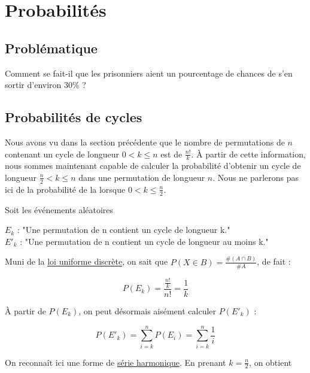 \section{Probabilités}
\subsection{Problématique}

	Comment se fait-il que les prisonniers aient un pourcentage de chances de s'en sortir d'environ 30\% ? \\

\subsection{Probabilités de cycles}

	Nous avons vu dans la section précédente que le nombre de permutations de $n$ contenant un cycle de longueur $0 < k \leq n$ est de $\frac{n!}{k}$.
	À partir de cette information, nous sommes maintenant capable de calculer la probabilité d'obtenir un cycle de longueur $\frac{n}{2} < k \leq n$ dans une permutation de longueur $n$.
	Nous ne parlerons pas ici de la probabilité de la lorsque $0 < k \leq \frac{n}{2}$.

	Soit les événements aléatoires
	\begin{center}
		$E_k$ : "Une permutation de n contient un cycle de longueur k." \\
		$E'_k$ : "Une permutation de n contient un cycle de longueur au moins k."
	\end{center}

	Muni de la \href{https://fr.wikipedia.org/wiki/Loi_uniforme_discr%C3%A8te#Calcul_d'une_probabilit%C3%A9}{loi uniforme discrète}, on sait que $P(X \in B) = \frac{\#(A \cap B)}{\#A}$, de fait :

	\begin{equation}
		P(E_k) = \frac{\frac{n!}{k}}{n!} = \frac{1}{k}
	\end{equation}

	À partir de $P(E_k)$, on peut désormais aisément calculer $P(E'_k)$ :

	\begin{equation}
		P(E'_k) = \sum_{i = k}^{n} P(E_i) = \sum_{i = k}^{n} \frac{1}{i}
	\end{equation}

	On reconnaît ici une forme de \href{https://en.wikipedia.org/wiki/Harmonic_series_(mathematics)#}{série harmonique}.
	En prenant $k = \frac{n}{2}$, on obtient

